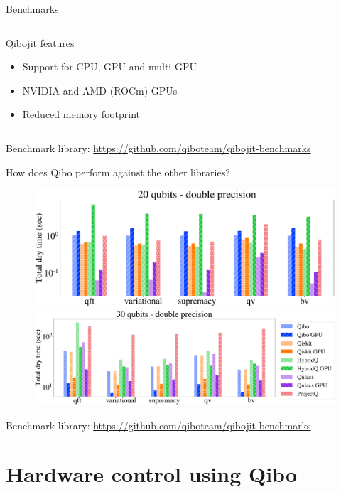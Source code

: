 \documentclass[11pt]{beamer}
\begin{document}
\begin{frame}{Benchmarks}
\begin{columns}
\begin{column}{0.4 \textwidth}
            Qibojit features
            \begin{itemize}
                \item Support for CPU, GPU and multi-GPU
                \item NVIDIA and AMD (ROCm) GPUs
                \item Reduced memory footprint
            \end{itemize}
        \end{column}
    \end{columns}
    Benchmark library: \url{https://github.com/qiboteam/qibojit-benchmarks}
    
\end{frame}


\begin{frame}{How does Qibo perform against the other libraries?}
    \begin{figure}
        \centering
        \includegraphics[height=0.4\textheight]{figures/libraries_double_20qubits_total_dry_time.pdf}
        \includegraphics[height=0.31\textheight]{figures/libraries_double_30qubits_total_dry_time.pdf}
    \end{figure}
    Benchmark library: \url{https://github.com/qiboteam/qibojit-benchmarks}
    
\end{frame}

\section{Hardware control using Qibo}
\end{document}
